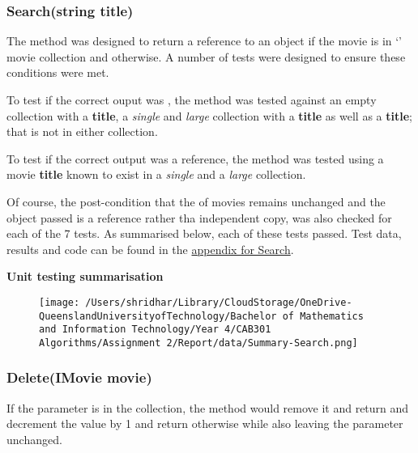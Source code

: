 \documentclass[a4paper]{article}
\begin{document}
\subsubsection{Search{(string title)}}
The  method was designed to return a reference to an  object if the movie is in `' movie collection and  otherwise. A number of tests were designed to ensure these conditions were met.
\vspace{3mm}

\noindent
To test if the correct ouput was , the method was tested against an empty collection with a  \textbf{title}, a \textit{single} and \textit{large} collection with a  \textbf{title} as well as a \textbf{title}; that is not in either collection. 
\vspace{3mm}

\noindent
To test if the correct output was a reference, the method was tested using a movie \textbf{title} known to exist in a \textit{single} and a \textit{large} collection.
\vspace{1mm}

\noindent
Of course, the post-condition that the  of movies remains unchanged and the object passed is a reference rather tha independent copy, was also checked for each of the 7 tests. As summarised below, each of these tests passed. Test data, results and code can be found in the \hyperlink{subsubsection.5.3.4}{appendix for Search}.
\vspace{2mm}

\noindent
\textbf{Unit testing summarisation}
\begin{figure}[H]
   \texttt{[image: /Users/shridhar/Library/CloudStorage/OneDrive-QueenslandUniversityofTechnology/Bachelor of Mathematics and Information Technology/Year 4/CAB301 Algorithms/Assignment 2/Report/data/Summary-Search.png]}
\end{figure}

\subsubsection{Delete{(IMovie movie)}}
If the parameter  is in the collection, the  method would remove it and return  and decrement the  value by 1 and return  otherwise while also leaving the  parameter unchanged.
\vspace{1mm}
\end{document}
